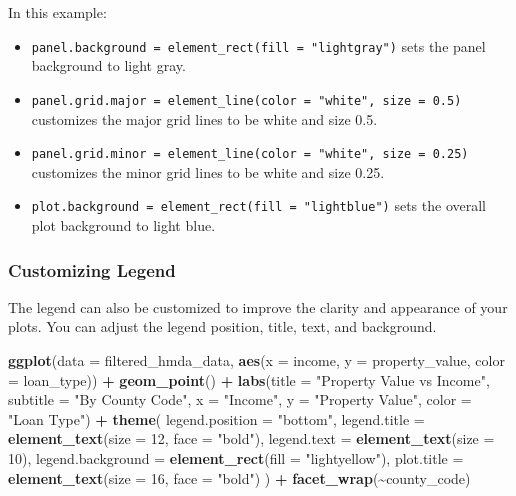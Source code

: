 \documentclass[
]{book}
\newenvironment{Shaded}{\begin{snugshade}}{\end{snugshade}}
\newcommand{\AttributeTok}[1]{\textcolor[rgb]{0.13,0.29,0.53}{#1}}
\newcommand{\DecValTok}[1]{\textcolor[rgb]{0.00,0.00,0.81}{#1}}
\newcommand{\FunctionTok}[1]{\textcolor[rgb]{0.13,0.29,0.53}{\textbf{#1}}}
\newcommand{\NormalTok}[1]{#1}
\newcommand{\SpecialCharTok}[1]{\textcolor[rgb]{0.81,0.36,0.00}{\textbf{#1}}}
\newcommand{\StringTok}[1]{\textcolor[rgb]{0.31,0.60,0.02}{#1}}
\begin{document}
In this example:

\begin{itemize}
\item
  \texttt{panel.background\ =\ element\_rect(fill\ =\ "lightgray")} sets the panel background to light gray.
\item
  \texttt{panel.grid.major\ =\ element\_line(color\ =\ "white",\ size\ =\ 0.5)} customizes the major grid lines to be white and size 0.5.
\item
  \texttt{panel.grid.minor\ =\ element\_line(color\ =\ "white",\ size\ =\ 0.25)} customizes the minor grid lines to be white and size 0.25.
\item
  \texttt{plot.background\ =\ element\_rect(fill\ =\ "lightblue")} sets the overall plot background to light blue.
\end{itemize}

\hypertarget{customizing-legend}{%
\subsubsection*{Customizing Legend}\label{customizing-legend}}

The legend can also be customized to improve the clarity and appearance of your plots. You can adjust the legend position, title, text, and background.

\begin{Shaded}
\begin{Highlighting}[]
\FunctionTok{ggplot}\NormalTok{(}\AttributeTok{data =}\NormalTok{ filtered\_hmda\_data, }\FunctionTok{aes}\NormalTok{(}\AttributeTok{x =}\NormalTok{ income, }\AttributeTok{y =}\NormalTok{ property\_value, }\AttributeTok{color =}\NormalTok{ loan\_type)) }\SpecialCharTok{+}
  \FunctionTok{geom\_point}\NormalTok{() }\SpecialCharTok{+}
  \FunctionTok{labs}\NormalTok{(}\AttributeTok{title =} \StringTok{"Property Value vs Income"}\NormalTok{,}
       \AttributeTok{subtitle =} \StringTok{"By County Code"}\NormalTok{,}
       \AttributeTok{x =} \StringTok{"Income"}\NormalTok{,}
       \AttributeTok{y =} \StringTok{"Property Value"}\NormalTok{,}
       \AttributeTok{color =} \StringTok{"Loan Type"}\NormalTok{) }\SpecialCharTok{+}
  \FunctionTok{theme}\NormalTok{(}
    \AttributeTok{legend.position =} \StringTok{"bottom"}\NormalTok{,}
    \AttributeTok{legend.title =} \FunctionTok{element\_text}\NormalTok{(}\AttributeTok{size =} \DecValTok{12}\NormalTok{, }\AttributeTok{face =} \StringTok{"bold"}\NormalTok{),}
    \AttributeTok{legend.text =} \FunctionTok{element\_text}\NormalTok{(}\AttributeTok{size =} \DecValTok{10}\NormalTok{),}
    \AttributeTok{legend.background =} \FunctionTok{element\_rect}\NormalTok{(}\AttributeTok{fill =} \StringTok{"lightyellow"}\NormalTok{),}
    \AttributeTok{plot.title =} \FunctionTok{element\_text}\NormalTok{(}\AttributeTok{size =} \DecValTok{16}\NormalTok{, }\AttributeTok{face =} \StringTok{"bold"}\NormalTok{)}
\NormalTok{  ) }\SpecialCharTok{+}
  \FunctionTok{facet\_wrap}\NormalTok{(}\SpecialCharTok{\textasciitilde{}}\NormalTok{county\_code)}
\end{Highlighting}
\end{Shaded}
\end{document}
